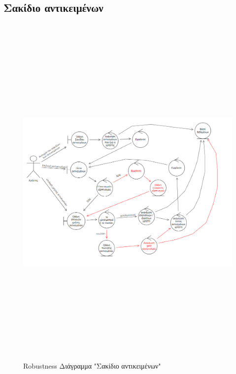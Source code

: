 \subsection{Σακίδιο αντικειμένων}
\begin{figure}[!htb]
  \centering
    \begin{center}
    \includegraphics[width=18cm,height=18cm]{robust_items.png}
    \caption{Robustness Διάγραμμα "Σακίδιο αντικειμένων"}
    \label{}
     \end{center}
\end{figure}
\newpage


